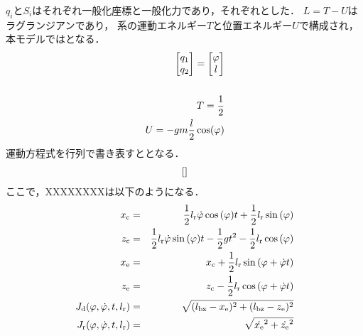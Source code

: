           $q_i$と$S_i$はそれぞれ一般化座標と一般化力であり，それぞれとした．
          $L=T-U$はラグランジアンであり，
          系の運動エネルギー$T$と位置エネルギー$U$で構成され，本モデルではとなる．  
          \begin{eqnarray}
              \equlabel{q}
              \begin{bmatrix}
                q_1 \\
                q_2 \\
                \end{bmatrix}
              =
              \begin{bmatrix}
                \varphi \\
                l \\
                \end{bmatrix}\\

              \equlabel{S}
              \\
              \equlabel{T}
              T = \frac{1}{2} \\
              \equlabel{U}
              U = -gm\frac{l}{2}\cos(\varphi)
              \end{eqnarray}  
          運動方程式を行列で書き表すととなる．
          \begin{eqnarray}
            \equlabel{Matrix}
            \left[\right]
            \end{eqnarray} 
          ここで，XXXXXXXXは以下のようになる．
            \begin{eqnarray}
              \equlabel{M}
              x_{\mathrm{c}}&=&\frac{1}{2}l_{\mathrm{r}}\dot{\varphi}\cos{(\varphi)}t+\frac{1}{2}l_{\mathrm{r}}\sin{(\varphi)}\\
              \equlabel{C}
              z_{\mathrm{c}}&=&\frac{1}{2}l_{\mathrm{r}}\dot{\varphi}\sin{(\varphi)}t-\frac{1}{2}gt^2-\frac{1}{2}l_{\mathrm{r}}\cos{(\varphi)}\\
              \equlabel{M11}
              x_{\mathrm{e}}&=&x_{\mathrm{c}}+\frac{1}{2}l_{\mathrm{r}}\sin{(\varphi+\dot{\varphi}t)}\\
              \equlabel{M22}
              z_{\mathrm{e}}&=&z_{\mathrm{c}}-\frac{1}{2}l_{\mathrm{r}}\cos{(\varphi+\dot{\varphi}t)}\\
              \equlabel{C1}
                J_{\mathrm{d}}(\varphi,\dot{\varphi},t,l_{\mathrm{r}})
                &=&\sqrt{(l_{\mathrm{bx}}-x_{\mathrm{e}})^2+(l_{\mathrm{bz}}-z_{\mathrm{e}})^2}\\
              \equlabel{C2}
              J_{\mathrm{r}}(\varphi,\dot{\varphi},t,l_{\mathrm{r}})
              &=&\sqrt{\dot{x_{\mathrm{e}}}^2+\dot{z_{\mathrm{e}}}^2}
            \end{eqnarray} 





